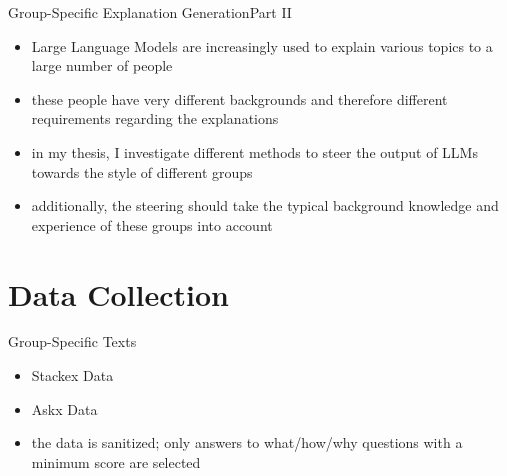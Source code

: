 \documentclass[]{beamer}
\begin{document}
\begin{frame}{Group-Specific Explanation Generation}{Part II}
  \begin{itemize}
    \item Large Language Models are increasingly used to explain various topics to a large number of people
    \item these people have very different backgrounds and therefore different requirements regarding the explanations
          \pause
    \item in my thesis, I investigate different methods to steer the output of LLMs towards the style of different groups
    \item additionally, the steering should take the typical background knowledge and experience of these groups into account
  \end{itemize}
\end{frame}


\section{Data Collection}
\begin{frame}{Group-Specific Texts}
  \begin{itemize}
    \item<2-> Stackex Data
    \item<2-> Askx Data
    \item<5-> the data is sanitized; only answers to what/how/why questions with a minimum score are selected
  \end{itemize}
\end{frame}
\end{document}
